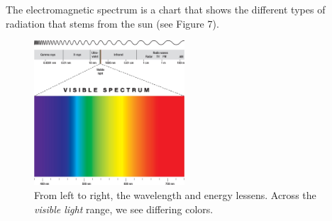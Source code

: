 \documentclass[a4paper]{article}
\begin{document}
The electromagnetic spectrum is a chart that shows the different types of radiation that stems from the sun (see Figure 7).

\begin{figure}[h!]
\centering
\includegraphics[width=0.5\textwidth]{figure_seven.jpeg}
\caption{From left to right, the wavelength and energy lessens. Across the \textit{visible light} range, we see differing colors.}
\end{figure}
\end{document}
